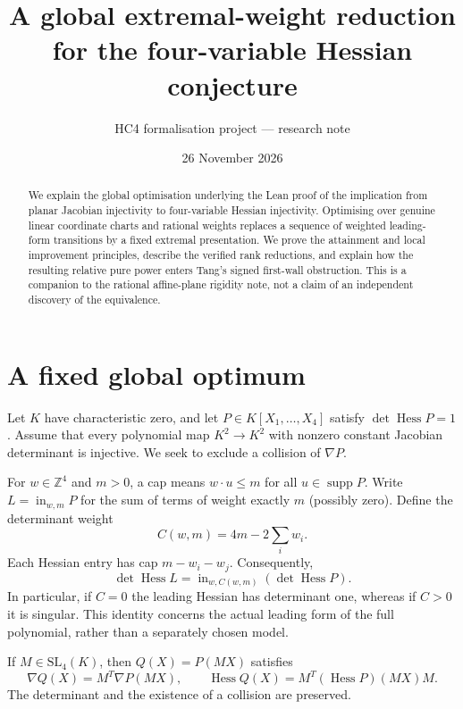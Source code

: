 \documentclass[11pt,a4paper]{article}
\title{A global extremal-weight reduction for the four-variable Hessian conjecture}
\author{HC4 formalisation project --- research note}
\date{26 November 2026}
\newcommand{\Hess}{\operatorname{Hess}}
\newcommand{\supp}{\operatorname{supp}}
\newcommand{\inw}{\operatorname{in}}
\begin{document}
\maketitle
\begin{abstract}
We explain the global optimisation underlying the Lean proof of the implication from planar Jacobian injectivity to four-variable Hessian injectivity. Optimising over genuine linear coordinate charts and rational weights replaces a sequence of weighted leading-form transitions by a fixed extremal presentation. We prove the attainment and local improvement principles, describe the verified rank reductions, and explain how the resulting relative pure power enters Tang's signed first-wall obstruction. This is a companion to the rational affine-plane rigidity note, not a claim of an independent discovery of the equivalence.
\end{abstract}

\section{A fixed global optimum}
Let $K$ have characteristic zero, and let $P\in K[X_1,\ldots,X_4]$ satisfy $\det\Hess P=1$. Assume that every polynomial map $K^2\to K^2$ with nonzero constant Jacobian determinant is injective. We seek to exclude a collision of $\nabla P$.

For $w\in\mathbb Z^4$ and $m>0$, a cap means $w\cdot u\le m$ for all $u\in\supp P$. Write $L=\inw_{w,m}P$ for the sum of terms of weight exactly $m$ (possibly zero). Define the determinant weight
\[
 C(w,m)=4m-2\sum_i w_i.
\]
Each Hessian entry has cap $m-w_i-w_j$. Consequently,
\begin{equation}\label{eq:det}
 \det\Hess L=\inw_{w,C(w,m)}(\det\Hess P).
\end{equation}
In particular, if $C=0$ the leading Hessian has determinant one, whereas if $C>0$ it is singular. This identity concerns the actual leading form of the full polynomial, rather than a separately chosen model.

If $M\in\mathrm{SL}_4(K)$, then $Q(X)=P(MX)$ satisfies
\[
 \nabla Q(X)=M^T\nabla P(MX),\qquad
 \Hess Q(X)=M^T(\Hess P)(MX)M.
\]
The determinant and the existence of a collision are preserved.
\end{document}
